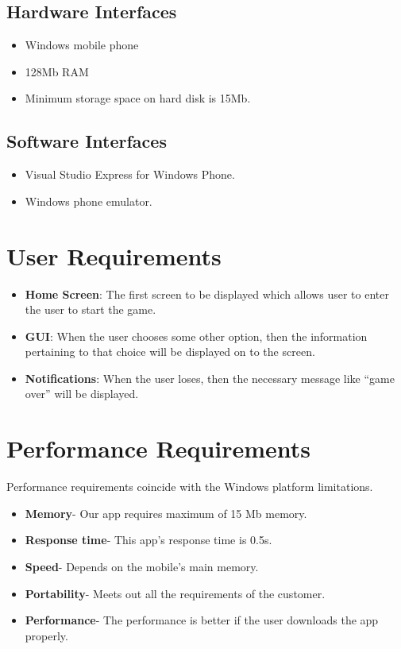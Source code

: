 \subsection{Hardware Interfaces}
\begin{itemize}
\item \textbf {}Windows mobile phone 
\item \textbf {}128Mb RAM
\item \textbf {}Minimum storage space on hard disk is 15Mb. 
\end{itemize}

\subsection{Software Interfaces}
\begin{itemize}
\item \textbf {}Visual Studio Express for Windows Phone.
\item \textbf {}Windows phone emulator.
\end{itemize}

\section{User Requirements}
\begin{itemize}
\item \textbf {Home Screen}: The  first  screen  to be displayed which allows user  to enter the user to start the game. 
\item \textbf {GUI}: When  the  user  chooses  some  other option,  then  the  information  pertaining  to that choice will be displayed on to the screen.
\item \textbf {Notifications}: When  the user loses, then the necessary message like “game over” will be displayed. 
\end{itemize}
\section{Performance Requirements}
\hspace{1cm}
Performance requirements coincide with the Windows platform limitations. 
\begin{itemize}
	\item \textbf {Memory}- Our app requires maximum of 15 Mb memory.
	\item \textbf {Response time}- This app’s response time is 0.5s.
	\item \textbf {Speed}- Depends on the mobile’s main memory.
	\item \textbf {Portability}- Meets out all the requirements of the customer.
	\item \textbf {Performance}- The performance is better if the user downloads the app properly.

\end{itemize}


